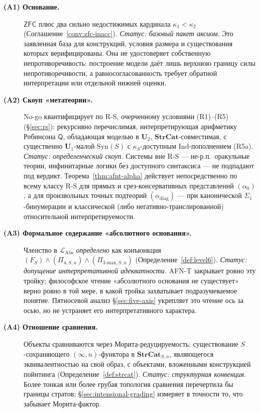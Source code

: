 \documentclass[11pt]{article}
\theoremstyle{plain}
\theoremstyle{definition}
\newcommand{\RS}{\mathrm{R\text{-}S}}
\newcommand{\LAbs}{\mathcal{L}_{\mathrm{Abs}}}
\newcommand{\Syn}{\mathrm{Syn}}
\newcommand{\ZFC}{\mathsf{ZFC}}
\begin{document}
\begin{description}
\item[\textbf{(A1) Основание.}] $\ZFC$ плюс два сильно недостижимых кардинала $\kappa_1<\kappa_2$ (Соглашение~\ref{conv:zfc-inacc}). \emph{Статус: базовый пакет аксиом.} Это заявленная база для конструкций, условия размера и существования которых верифицированы. Она не удостоверяет собственную непротиворечивость: построение модели даёт лишь верхнюю границу силы непротиворечивости, а равносогласованность требует обратной интерпретации или отдельной нижней оценки.
\item[\textbf{(A2) Скоуп «метатеории».}] No-go квантифицирует по $\RS$, очерченному условиями (R1)--(R5) (\S\ref{sec:rs}): рекурсивно перечислимая, интерпретирующая арифметику Робинсона $\mathsf{Q}$, обладающая моделью в $\mathbf{U}_2$, $\mathbf{StrCat}$-совместимая, с существенно $\mathbf{U}_1$-малой $\Syn(S)$ с $\kappa_S$-доступным $\mathrm{Ind}$-пополнением (R5a). \emph{Статус: определенческий скоуп.} Системы вне $\RS$ --- не-р.п.\ оракульные теории, инфинитарные логики без доступного синтаксиса --- не подпадают под вердикт. Теорема~\ref{thm:afnt-alpha} действует непосредственно по всему классу $\RS$ для прямых и срез-консервативных представлений $(\alpha_0)$, а для произвольных точных подтеорий $(\alpha_{\mathrm{diag}})$ --- при канонической $\Sigma_1$-бинумерации и классической (либо негативно-транслированной) относительной интерпретируемости.
\item[\textbf{(A3) Формальное содержание «абсолютного основания».}] Членство в $\LAbs$ \emph{определено} как конъюнкция $(F_S) \wedge (\Pi_{4, S, n}) \wedge (\Pi_{3\text{-max}, S, n})$ (Определение~\ref{def:level6}). \emph{Статус: допущение интерпретативной адекватности.} AFN-T закрывает ровно эту тройку; философское чтение «абсолютного основания не существует» верно ровно в той мере, в какой тройка захватывает подразумеваемое понятие. Пятиосевой анализ \S\ref{sec:five-axis} укрепляет это чтение ось за осью, но не устраняет его интерпретативного характера.
\item[\textbf{(A4) Отношение сравнения.}] Объекты сравниваются через Морита-редуцируемость: существование $S$-сохраняющего $(\infty, n)$-функтора в $\mathbf{StrCat}_{S, n}$, являющегося эквивалентностью на свой образ, с объектами, вложенными конструкцией пойнтинга (Определение~\ref{def:strcat}). \emph{Статус: структурная конвенция.} Более тонкая или более грубая топология сравнения перечертила бы границы стратов; \S\ref{sec:intensional-grading} измеряет в точности то, что забывает Морита-фактор.

\end{description}
\end{document}
